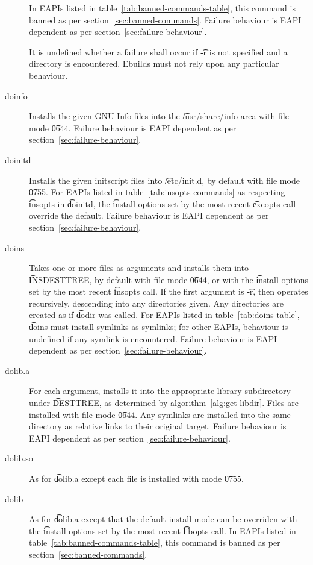 \begin{description}
    In EAPIs listed in table~\ref{tab:banned-commands-table}, this command is banned as per
    section~\ref{sec:banned-commands}.
    Failure behaviour is EAPI dependent as per section~\ref{sec:failure-behaviour}.

    It is undefined whether a failure shall occur if \t{-r} is not specified and a directory is
    encountered. Ebuilds must not rely upon any particular behaviour.

\item[doinfo] Installs the given GNU Info files into the \t{/usr/share/info} area with file mode
    \t{0644}. Failure behaviour is EAPI dependent as per section~\ref{sec:failure-behaviour}.

\item[doinitd] Installs the given initscript files into \t{/etc/init.d}, by default with file mode
    \t{0755}. For EAPIs listed in table~\ref{tab:insopts-commands} as respecting \t{insopts}
    in \t{doinitd}, the \t{install} options set by the most recent \t{exeopts} call override
    the default. Failure behaviour is EAPI dependent as per section~\ref{sec:failure-behaviour}.

\item[doins]  Takes one or more files as arguments and installs them into
    \t{INSDESTTREE}, by default with file mode \t{0644}, or with the \t{install} options set by
    the most recent \t{insopts} call. If the first argument is \t{-r}, then operates recursively,
    descending into any directories given. Any directories are created as if \t{dodir} was called.
    For EAPIs listed in table~\ref{tab:doins-table}, \t{doins} must install symlinks as symlinks;
    for other EAPIs, behaviour is undefined if any symlink is encountered. Failure behaviour is
    EAPI dependent as per section~\ref{sec:failure-behaviour}.

\item[dolib.a] For each argument, installs it into the appropriate library subdirectory under
    \t{DESTTREE}, as determined by algorithm~\ref{alg:get-libdir}. Files are installed with file
    mode \t{0644}. Any symlinks are installed into the same directory as relative links to their
    original target. Failure behaviour is EAPI dependent as per section~\ref{sec:failure-behaviour}.

\item[dolib.so] As for \t{dolib.a} except each file is installed with mode \t{0755}.

\item[dolib] As for \t{dolib.a} except that the default install mode can be overriden with
    the \t{install} options set by the most recent \t{libopts} call. In EAPIs listed
    in table~\ref{tab:banned-commands-table}, this command is banned as per
    section~\ref{sec:banned-commands}.


\end{description}
